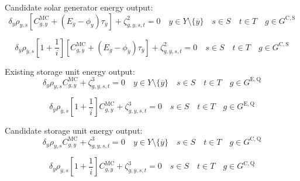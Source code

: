 \documentclass{article}
\newcommand{\sGeneratorsCandidateSolar}{G^{\mathrm{C,S}}}
\newcommand{\sStorageExisting}{G^{\mathrm{E,Q}}}
\newcommand{\sStorageCandidate}{G^{\mathrm{C,Q}}}
\newcommand{\sYears}{Y}
\newcommand{\sScenarios}{S}
\newcommand{\sIntervals}{T}
\newcommand{\iGenerator}{g}
\newcommand{\iYear}{y}
\newcommand{\iYearTerminal}{\overline{\iYear}}
\newcommand{\iScenario}{s}
\newcommand{\iInterval}{t}
\newcommand{\cScenarioDuration}[1][\iYear,\iScenario]{\rho_{#1}}
\newcommand{\cMarginalCost}[1][\iGenerator,\iYear]{C^{\mathrm{MC}}_{#1}}
\newcommand{\cEmissionsIntensity}[1][\iGenerator]{E_{#1}}
\newcommand{\cInterestRate}{i}
\newcommand{\cDiscountRate}[1][\iYear]{\delta_{#1}}
\newcommand{\vBaseline}[1][\iYear]{\phi_{#1}}
\newcommand{\vPermitPrice}[1][\iYear]{\tau_{#1}}
\newcommand{\dGeneratorEnergyOutput}[1][\iGenerator,\iYear,\iScenario,\iInterval]{\zeta_{#1}^{2}}
\newcommand{\dStorageEnergyOutput}[1][\iGenerator,\iYear,\iScenario,\iInterval]{\zeta_{#1}^{3}}
\begin{document}
Candidate solar generator energy output:
\begin{equation}
\cDiscountRate\cScenarioDuration \left[\cMarginalCost + \left(\cEmissionsIntensity - \vBaseline\right)\vPermitPrice \right] + \dGeneratorEnergyOutput = 0 \quad \iYear \in \sYears \setminus \{\iYearTerminal\} \quad \iScenario \in \sScenarios \quad \iInterval \in \sIntervals \quad \iGenerator \in \sGeneratorsCandidateSolar
\end{equation}

\begin{equation}
\cDiscountRate[\iYearTerminal] \cScenarioDuration[\iYearTerminal,\iScenario] \left[1 + \frac{1}{\cInterestRate}\right] \left[\cMarginalCost[\iGenerator,\iYearTerminal] + \left(\cEmissionsIntensity - \vBaseline[\iYearTerminal]\right)\vPermitPrice[\iYearTerminal] \right] + \dGeneratorEnergyOutput[\iGenerator,\iYearTerminal,\iScenario,\iInterval] = 0 \quad \iScenario \in \sScenarios \quad \iInterval \in \sIntervals  \quad \iGenerator \in \sGeneratorsCandidateSolar
\end{equation}

Existing storage unit energy output:
\begin{equation}
\cDiscountRate\cScenarioDuration \cMarginalCost + \dStorageEnergyOutput = 0 \quad \iYear \in \sYears \setminus \{\iYearTerminal\} \quad \iScenario \in \sScenarios \quad \iInterval \in \sIntervals \quad  \iGenerator \in \sStorageExisting
\end{equation}

\begin{equation}
\cDiscountRate[\iYearTerminal] \cScenarioDuration[\iYearTerminal,\iScenario] \left[1 + \frac{1}{\cInterestRate}\right] \cMarginalCost + \dStorageEnergyOutput[\iGenerator,\iYearTerminal,\iScenario,\iInterval] = 0 \quad \iScenario \in \sScenarios \quad \iInterval \in \sIntervals \quad  \iGenerator \in \sStorageExisting
\end{equation}

Candidate storage unit energy output:
\begin{equation}
\cDiscountRate\cScenarioDuration \cMarginalCost + \dStorageEnergyOutput = 0 \quad \iYear \in \sYears \setminus \{\iYearTerminal\} \quad \iScenario \in \sScenarios \quad \iInterval \in \sIntervals \quad  \iGenerator \in \sStorageCandidate
\end{equation}

\begin{equation}
\cDiscountRate[\iYearTerminal] \cScenarioDuration[\iYearTerminal,\iScenario] \left[1 + \frac{1}{\cInterestRate}\right] \cMarginalCost + \dStorageEnergyOutput[\iGenerator, \iYearTerminal,\iScenario,\iInterval] = 0 \quad \iScenario \in \sScenarios \quad \iInterval \in \sIntervals \quad  \iGenerator \in \sStorageCandidate
\end{equation}
\end{document}
